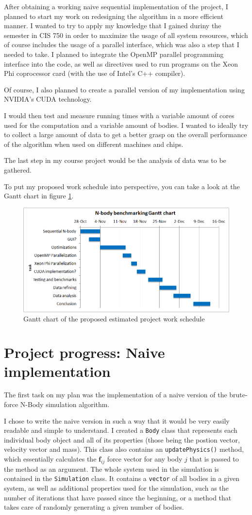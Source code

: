 \documentclass[journal]{IEEEtran}
\begin{document}
		After obtaining a working naive sequential implementation of the project, I planned to start my work on redesigning the algorithm in a more efficient manner. I wanted to try to apply my knowledge that I gained duriny the semester in CIS 750 in order to maximize the usage of all system resources, which of course includes the usage of a parallel interface, which was also a step that I needed to take. I planned to integrate the OpenMP parallel programming interface into the code, as well as directives used to run programs on the Xeon Phi coprocessor card (with the use of Intel's C++ compiler).
		
		Of course, I also planned to create a parallel version of my implementation using NVIDIA’s CUDA technology.
		
		I would then test and measure running times with a variable amount of cores used for the computation and a variable amount of bodies. I wanted to ideally try to collect a large amount of data to get a better grasp on the overall performance of the algorithm when used on different machines and chips.
		
		The last step in my course project would be the analysis of data was to be gathered.
		
		To put my proposed work schedule into perspective, you can take a look at the Gantt chart in figure \ref{gantt}.
		
		\begin{figure}[ht]
			\centering
			\includegraphics[width=.45\textwidth]{ganttchart.png}
			\caption{\label{gantt}Gantt chart of the proposed estimated project work schedule}
		\end{figure} 
		
	\newpage
	\section{Project progress: Naive implementation}
	
		The first task on my plan was the implementation of a naive version of the brute-force N-Body simulation algorithm. 
		
		I chose to write the naive version in such a way that it would be very easily readable and simple to understand. I created a \texttt{Body} class that represents each individual body object and all of its properties (those being the postion vector, velocity vector and mass). This class also contains an \texttt{updatePhysics()} method, which essentially calculates the $\textbf{f}_{ij}$ force vector for any body $j$ that is passed to the method as an argument. The whole system used in the simulation is contained in the \texttt{Simulation} class. It contains a \texttt{vector} of all bodies in a given system, as well as additional properties used for the simulation, such as the number of iterations that have passed since the beginning, or a method that takes care of randomly generating a given number of bodies.
		
\end{document}
